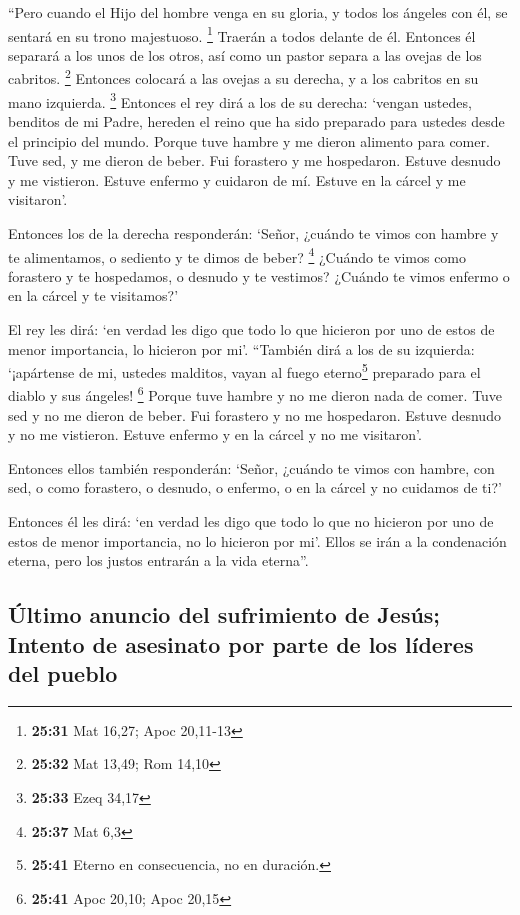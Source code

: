  ``Pero cuando el Hijo del hombre venga en su gloria, y
todos los ángeles con él, se sentará en su trono majestuoso. \footnote{\textbf{25:31}
  Mat 16,27; Apoc 20,11-13}  Traerán a todos delante de
él. Entonces él separará a los unos de los otros, así como un pastor
separa a las ovejas de los cabritos. \footnote{\textbf{25:32} Mat 13,49;
  Rom 14,10}  Entonces colocará a las ovejas a su
derecha, y a los cabritos en su mano izquierda. \footnote{\textbf{25:33}
  Ezeq 34,17}  Entonces el rey dirá a los de su derecha:
`vengan ustedes, benditos de mi Padre, hereden el reino que ha sido
preparado para ustedes desde el principio del mundo. 
Porque tuve hambre y me dieron alimento para comer. Tuve sed, y me
dieron de beber. Fui forastero y me hospedaron.  Estuve
desnudo y me vistieron. Estuve enfermo y cuidaron de mí. Estuve en la
cárcel y me visitaron'.

 Entonces los de la derecha responderán: `Señor, ¿cuándo
te vimos con hambre y te alimentamos, o sediento y te dimos de beber?
\footnote{\textbf{25:37} Mat 6,3}  ¿Cuándo te vimos como
forastero y te hospedamos, o desnudo y te vestimos? 
¿Cuándo te vimos enfermo o en la cárcel y te visitamos?'

 El rey les dirá: `en verdad les digo que todo lo que
hicieron por uno de estos de menor importancia, lo hicieron por mi'.
 ``También dirá a los de su izquierda: `¡apártense de mi,
ustedes malditos, vayan al fuego eterno\footnote{\textbf{25:41} Eterno
  en consecuencia, no en duración.} preparado para el diablo y sus
ángeles! \footnote{\textbf{25:41} Apoc 20,10; Apoc 20,15}
 Porque tuve hambre y no me dieron nada de comer. Tuve
sed y no me dieron de beber.  Fui forastero y no me
hospedaron. Estuve desnudo y no me vistieron. Estuve enfermo y en la
cárcel y no me visitaron'.

 Entonces ellos también responderán: `Señor, ¿cuándo te
vimos con hambre, con sed, o como forastero, o desnudo, o enfermo, o en
la cárcel y no cuidamos de ti?'

 Entonces él les dirá: `en verdad les digo que todo lo
que no hicieron por uno de estos de menor importancia, no lo hicieron
por mi'.  Ellos se irán a la condenación eterna, pero los
justos entrarán a la vida eterna''.

\hypertarget{uxfaltimo-anuncio-del-sufrimiento-de-jesuxfas-intento-de-asesinato-por-parte-de-los-luxedderes-del-pueblo}{%
\subsection{Último anuncio del sufrimiento de Jesús; Intento de
asesinato por parte de los líderes del
pueblo}\label{uxfaltimo-anuncio-del-sufrimiento-de-jesuxfas-intento-de-asesinato-por-parte-de-los-luxedderes-del-pueblo}}

